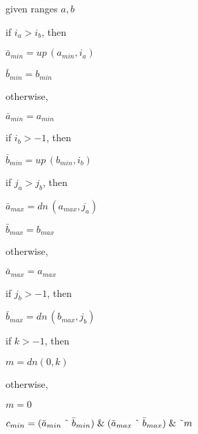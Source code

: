 \documentclass{article}
\begin{document}
given ranges $a,b$

if $i_a > i_b$, then

\quad $\bar a_{min} = up\,(a_{min},i_a) $

\quad $\bar b_{min} = b_{min}$

otherwise,

\quad $\bar a_{min} = a_{min} $

\quad if $i_b > -1$, then

\quad\quad $\bar b_{min} = up\,(b_{min},i_b) $

if $j_a > j_b$, then

\quad $\bar a_{max} = dn\,(a_{max},j_a) $

\quad $\bar b_{max} = b_{max}$

otherwise,

\quad $\bar a_{max} = a_{max} $

\quad if $j_b > -1$, then

\quad\quad $\bar b_{max} = dn\,(b_{max},j_b) $

if $k > -1$, then

\quad $m = dn(0,k)$

otherwise,

\quad $m = 0$

$c_{min} = (\bar a_{min} \; \text{\^{}} \; \bar b_{min})\;\&\;(\bar a_{max} \; 
\text{\^{}} \; \bar b_{max})\;\&\; \text{\~{}} m $

\vspace{10pt}
\end{document}
